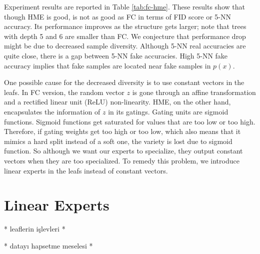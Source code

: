 \documentclass[a4paper,onesided,12pt]{report}
\begin{document}
Experiment results are reported in Table \ref{tab:fc-hme}. These results show that though HME is good, is not as good as FC in terms of FID score or 5-NN accuracy. Its performance improves as the structure gets larger; note that trees with depth 5 and 6 are smaller than FC. We conjecture that performance drop might be due to decreased sample diversity. Although 5-NN real accuracies are quite close, there is a gap between 5-NN fake accuracies. High 5-NN fake accuracy implies that fake samples are located near fake samples in $p(x)$.

One possible cause for the decreased diversity is to use constant vectors in the leafs. In FC version, the random vector $z$ is gone through an affine transformation and a rectified linear unit (ReLU) non-linearity. HME, on the other hand, encapsulates the information of $z$ in its gatings. Gating units are sigmoid functions. Sigmoid functions get saturated for values that are too low or too high. Therefore, if gating weights get too high or too low, which also means that it mimics a hard split instead of a soft one, the variety is lost due to sigmoid function. So although we want our experts to specialize, they output constant vectors when they are too specialized. To remedy this problem, we introduce linear experts in the leafs instead of constant vectors.

\section{Linear Experts}
\label{sec:hme-linear}

* leaflerin işlevleri *

* datayı hapsetme meselesi *
\end{document}
